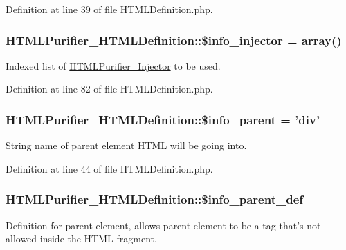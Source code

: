 Definition at line 39 of file H\+T\+M\+L\+Definition.\+php.

\hypertarget{classHTMLPurifier__HTMLDefinition_a22beaf3dd6ed19e1f850f3c146c7f2d7}{
\subsubsection[{\$info\+\_\+injector}]{\setlength{\rightskip}{0pt plus 5cm}H\+T\+M\+L\+Purifier\+\_\+\+H\+T\+M\+L\+Definition\+::\$info\+\_\+injector = array()}}\label{classHTMLPurifier__HTMLDefinition_a22beaf3dd6ed19e1f850f3c146c7f2d7}
Indexed list of \hyperlink{classHTMLPurifier__Injector}{H\+T\+M\+L\+Purifier\+\_\+\+Injector} to be used. 

Definition at line 82 of file H\+T\+M\+L\+Definition.\+php.

\hypertarget{classHTMLPurifier__HTMLDefinition_ab32cb20536d9eea061c61c5f895af3b8}{
\subsubsection[{\$info\+\_\+parent}]{\setlength{\rightskip}{0pt plus 5cm}H\+T\+M\+L\+Purifier\+\_\+\+H\+T\+M\+L\+Definition\+::\$info\+\_\+parent = 'div'}}\label{classHTMLPurifier__HTMLDefinition_ab32cb20536d9eea061c61c5f895af3b8}
String name of parent element H\+T\+M\+L will be going into. 

Definition at line 44 of file H\+T\+M\+L\+Definition.\+php.

\hypertarget{classHTMLPurifier__HTMLDefinition_ae715103eaaad56c4d09a9c32db82e022}{
\subsubsection[{\$info\+\_\+parent\+\_\+def}]{\setlength{\rightskip}{0pt plus 5cm}H\+T\+M\+L\+Purifier\+\_\+\+H\+T\+M\+L\+Definition\+::\$info\+\_\+parent\+\_\+def}}\label{classHTMLPurifier__HTMLDefinition_ae715103eaaad56c4d09a9c32db82e022}
Definition for parent element, allows parent element to be a tag that's not allowed inside the H\+T\+M\+L fragment. 

